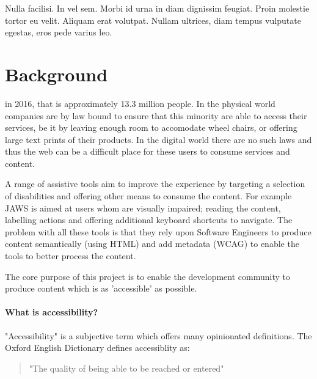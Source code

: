 \begin{savequote}[75mm]
Nulla facilisi. In vel sem. Morbi id urna in diam dignissim feugiat. Proin molestie tortor eu velit. Aliquam erat volutpat. Nullam ultrices, diam tempus vulputate egestas, eros pede varius leo.
\end{savequote}

\chapter{Background}
 in
2016, that is
approximately 13.3 million people. In the physical world companies are by law
bound to ensure that this minority are able to access their services, be it by
leaving enough room to accomodate wheel chairs, or offering large text prints
of their products. In the digital world there are no such laws and thus the web can be a
difficult place for these users to consume services and content.

A range of assistive
tools aim to improve the experience by targeting a selection of
disabilities and offering other means to consume the content. For example
JAWS is aimed at users whom are visually impaired; reading the content,
labelling actions and offering additional keyboard shortcuts to navigate. The
problem
with all these tools is that they rely upon Software Engineers to produce
content semantically (using HTML) and add metadata (WCAG) to enable the tools
to better process the content.

The core purpose of this project is to enable the development community to
produce content which is as 'accessible' as possible.

\subsubsection{What is accessibility?}
"Accessibility" is a subjective term which offers many opinionated
definitions. The Oxford English Dictionary defines accessiblity as:
\begin{quote}
"The quality of being able to be reached or entered"
\end{quote}

